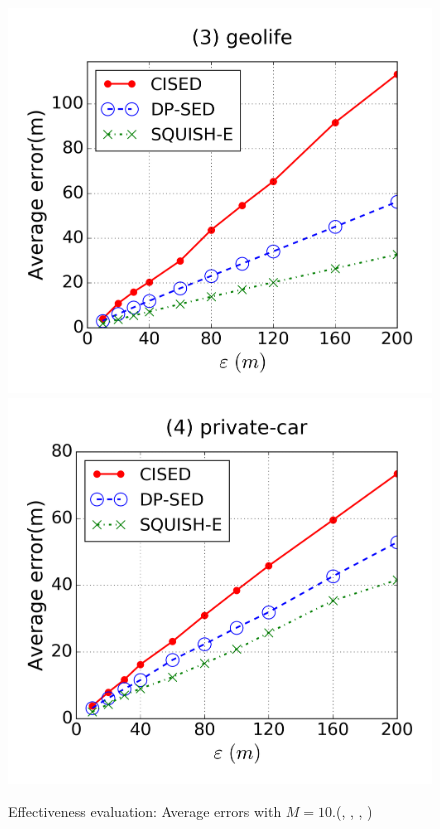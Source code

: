 \begin{figure}[tb]
\includegraphics[scale = 0.250]{figures/Exp-error-epsilon-geolife.png}
\includegraphics[scale = 0.250]{figures/Exp-error-epsilon-private.png}
\vspace{-3ex}
\caption{\small Effectiveness evaluation: Average errors with $M=10$.(\cist, \cista, \dpa, \squishe)}
\label{fig:ae-m10}
\vspace{-1ex}
\end{figure}

